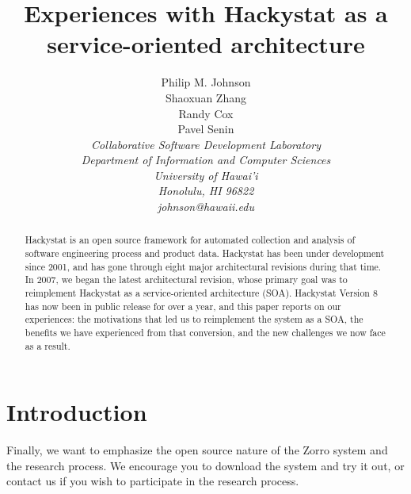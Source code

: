 \documentclass[conference,12pt]{IEEEtran}
\begin{document}
\title{Experiences with Hackystat as a service-oriented architecture}

\author{Philip M. Johnson \\
        Shaoxuan Zhang \\
        Randy Cox \\
        Pavel Senin \\
\em  Collaborative Software Development Laboratory \\
\em  Department of Information and Computer Sciences \\
\em  University of Hawai'i \\
\em  Honolulu, HI 96822 \\
\em  johnson@hawaii.edu \\
}


\maketitle

\begin{abstract}  %
Hackystat is an open source framework for automated collection and analysis of software engineering process and product data.  Hackystat has been under development since 2001, and has gone through eight major architectural revisions during that time.  In 2007, we began the latest architectural revision, whose primary goal was to 
reimplement Hackystat as a service-oriented architecture (SOA).  Hackystat Version 8 has now been in public release for over a year, and this paper reports on our 
experiences:  the motivations that led us to reimplement the system as a SOA, the benefits we have experienced from that conversion, and the new challenges we now
face as a result. 
\end{abstract}

\section{Introduction}
\label{sec:intro}


Finally, we want to emphasize the open source nature of the Zorro system and 
the research process.   We encourage you to download the system and try it out,
or contact us if you wish to participate in the research process. 



\end{document}
